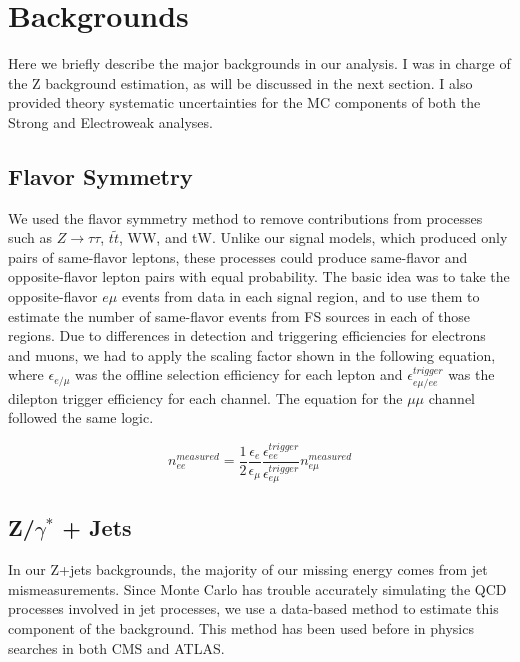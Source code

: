 \section{Backgrounds}

Here we briefly describe the major backgrounds in our analysis. I was in charge of the Z background estimation, as will be discussed in the next section. I also provided theory systematic uncertainties for the MC components of both the Strong and Electroweak analyses.

\subsection*{Flavor Symmetry}

We used the flavor symmetry method to remove contributions from processes such as $Z\rightarrow\tau\tau$, $t\tilde{t}$, WW, and tW. Unlike our signal models, which produced only pairs of same-flavor leptons, these processes could produce same-flavor and opposite-flavor lepton pairs with equal probability. The basic idea was to take the opposite-flavor $e\mu$ events from data in each signal region, and to use them to estimate the number of same-flavor events from FS sources in each of those regions. Due to differences in detection and triggering efficiencies for electrons and muons, we had to apply the scaling factor shown in the following equation, where $\epsilon_{e/\mu}$ was the offline selection efficiency for each lepton and $\epsilon_{e\mu/ee}^{trigger}$ was the dilepton trigger efficiency for each channel. The equation for the $\mu\mu$ channel followed the same logic.

\begin{equation}
n_{ee}^{measured} = \frac{1}{2}\frac{\epsilon_e}{\epsilon_{\mu}}\frac{\epsilon_{ee}^{trigger}}{\epsilon_{e\mu}^{trigger}}n_{e\mu}^{measured}
\end{equation}

\subsection*{Z/$\gamma^*$ + Jets}

In our Z+jets backgrounds, the majority of our missing energy comes from jet mismeasurements. Since Monte Carlo has trouble accurately simulating the QCD processes involved in jet processes, we use a data-based method to estimate this component of the background. This method has been used before in physics searches in both CMS and ATLAS.

